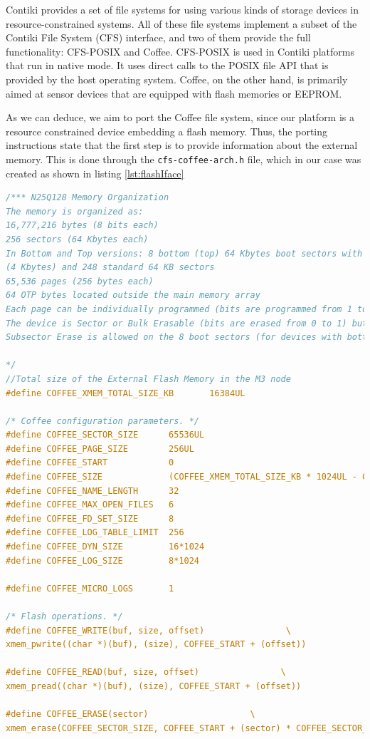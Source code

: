 \begin{citeverbatim}
	Contiki provides a set of file systems for using various kinds of storage devices in resource-constrained systems. 
	All of these file systems implement a subset of the Contiki File System (CFS) interface, and two of them provide the full functionality: CFS-POSIX and Coffee.
	CFS-POSIX is used in Contiki platforms that run in native mode. 
	It uses direct calls to the POSIX file API that is provided by the host operating system. 
	Coffee, on the other hand, is primarily aimed at sensor devices that are equipped with flash memories or EEPROM.
\end{citeverbatim}

As we can deduce, we aim to port the Coffee file system, since our platform is a resource constrained device embedding a flash memory.
Thus, the porting instructions state that the first step is to provide information about the external memory.
This is done through the \texttt{cfs-coffee-arch.h} file, which in our case was created as shown in listing \ref{lst:flashIface}
\begin{lstlisting}[language=C, caption=Contiki header for external memory features, label=lst:flashIface]
/*** N25Q128 Memory Organization
The memory is organized as:
16,777,216 bytes (8 bits each)
256 sectors (64 Kbytes each)
In Bottom and Top versions: 8 bottom (top) 64 Kbytes boot sectors with 16 subsectors
(4 Kbytes) and 248 standard 64 KB sectors
65,536 pages (256 bytes each)
64 OTP bytes located outside the main memory array
Each page can be individually programmed (bits are programmed from 1 to 0).
The device is Sector or Bulk Erasable (bits are erased from 0 to 1) but not Page Erasable.
Subsector Erase is allowed on the 8 boot sectors (for devices with bottom or top architecture).

*/
//Total size of the External Flash Memory in the M3 node
#define COFFEE_XMEM_TOTAL_SIZE_KB       16384UL

/* Coffee configuration parameters. */
#define COFFEE_SECTOR_SIZE   	65536UL
#define COFFEE_PAGE_SIZE       	256UL
#define COFFEE_START            0
#define COFFEE_SIZE             (COFFEE_XMEM_TOTAL_SIZE_KB * 1024UL - COFFEE_START)
#define COFFEE_NAME_LENGTH      32
#define COFFEE_MAX_OPEN_FILES   6
#define COFFEE_FD_SET_SIZE      8
#define COFFEE_LOG_TABLE_LIMIT 	256
#define COFFEE_DYN_SIZE         16*1024
#define COFFEE_LOG_SIZE         8*1024

#define COFFEE_MICRO_LOGS       1

/* Flash operations. */
#define COFFEE_WRITE(buf, size, offset)                \
xmem_pwrite((char *)(buf), (size), COFFEE_START + (offset))

#define COFFEE_READ(buf, size, offset)                \
xmem_pread((char *)(buf), (size), COFFEE_START + (offset))

#define COFFEE_ERASE(sector)                    \
xmem_erase(COFFEE_SECTOR_SIZE, COFFEE_START + (sector) * COFFEE_SECTOR_SIZE)
\end{lstlisting}
